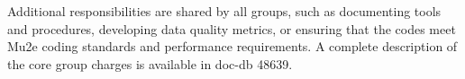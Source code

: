 Additional responsibilities are shared by all groups, such as documenting tools and procedures, developing data quality metrics, or ensuring that the codes meet Mu2e coding standards and performance requirements. A complete description of the core group charges is available in doc-db 48639.




